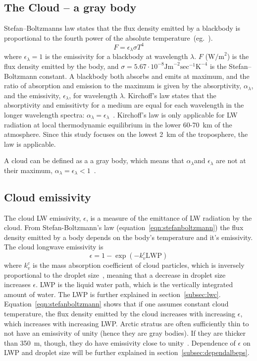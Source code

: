 \subsection{The Cloud -- a gray body}
Stefan–Boltzmanns law states that the flux density emitted by a blackbody is proportional to the fourth power of the absolute temperature~(eg.~\citep{Liou2002}).
\begin{equation}
F = \epsilon_{\lambda} \sigma T^4
\label{eqn:stefanboltzmann}
\end{equation}
where $\epsilon_{\lambda} = 1$ is the emissivity for a blackbody at wavelength $\lambda$. $F$ ($\text{W/m}^2$) is the flux density emitted  by the body, and $\sigma = 5.67\cdot 10^{-8} \text{Jm}^{-2}\text{sec}^{-1}\text{K}^{-4}$ is the Stefan–Boltzmann constant. A blackbody both absorbs and emits at maximum, and the ratio of absorption and emission to the maximum is given by the absorptivity, $\alpha_{\lambda}$, and the emissivity, $\epsilon_{\lambda}$, for wavelength $\lambda$. Kirchoff's law states that the absorptivity and emissitivty for a medium are equal for each wavelength in the longer wavelength spectra: $\alpha_{\lambda} = \epsilon_{\lambda}$~\citep{Liou2002}. Kirchoff's law is only applicable for LW radiation at local thermodynamic equilibrium in the lower 60-70~km of the atmosphere. Since this study focuses on the lowest 2~km of the troposphere, the law is applicable.

A cloud can be defined as a a gray body, which means that $\alpha_{\lambda}$and $\epsilon_{\lambda}$ are not at their maximum, $\alpha_{\lambda}=\epsilon_{\lambda}<1$~\citep{Liou2002}.

\subsection{Cloud emissivity}
The cloud LW emissivity, $\epsilon$, is a measure of the emittance of LW radiation by the cloud. From Stefan-Boltzmann's law (equation~\ref{eqn:stefanboltzmann}) the flux density emitted by a body depends on the body's temperature and it's emissivity. The cloud longwave emissivity is~\citep{Liou1992}
\begin{equation}
\epsilon = 1 - \exp(-k_v^c \text{LWP})
\label{eqn:epsilon_lw}
\end{equation}
where $k_v^c$ is the mass absorption coefficient of cloud particles, which is inversely proportional to the droplet size~\citep{Alterskjaer2010}, meaning that a decrease in droplet size increases $\epsilon$. LWP is the liquid water path, which is the vertically integrated amount of water. The LWP is further explained in section~\ref{subsec:lwc}. Equation~\ref{eqn:stefanboltzmann} shows that if one assumes constant cloud temperature, the flux density emitted by the cloud increases with increasing $\epsilon$, which increases with increasing LWP. Arctic stratus are often sufficiently thin to not have an emissivity of unity (hence they are gray bodies). If they are thicker than 350~m, though, they do have emissivity close to unity~\citep{Herman1980}. Dependence of $\epsilon$ on LWP and droplet size will be further explained in section~\ref{subsec:dependalbeps}.

